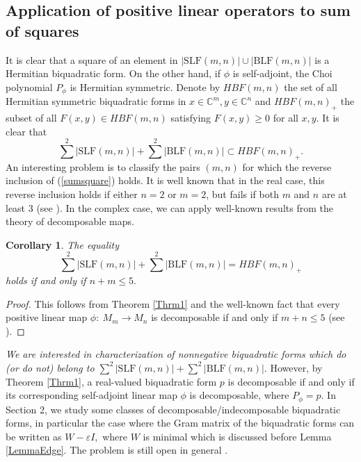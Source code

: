 \documentclass[12pt,a4paper]{amsart}
\theoremstyle{plain}
\newtheorem{corollary}[theorem]{Corollary}
\theoremstyle{remark}
\theoremstyle{definition}
\def \C {\mathbb{C}}
\begin{document}
\subsection{Application of positive linear operators to sum of squares}
 
It is clear that a square of an element in $|\textrm{SLF}(m,n)| \cup |\textrm{BLF}(m,n)|$ is a Hermitian biquadratic form. On the other hand, if $\phi$ is self-adjoint, the Choi polynomial $P_{\phi}$ is Hermitian symmetric. Denote by $HBF(m,n)$ the set of all Hermitian symmetric biquadratic forms in $x\in \C^m, y\in \C^n$ and $HBF(m,n)_+$ the subset of all $F(x,y) \in HBF(m,n)$ satisfying $F(x,y) \ge 0$ for all $x,y.$ It is clear that 
\begin{equation}\label{sumsquare}
	{\sum}^2 |\textrm{SLF}(m,n)| + {\sum}^2|\textrm{BLF}(m,n)| \subset HBF(m,n)_+. 
\end{equation}
An interesting problem is to classify the pairs $(m, n)$ for which the reverse inclusion of (\ref{sumsquare}) holds. It is well known that in the real case, this reverse inclusion holds if either $n=2$ or $m=2$, but fails if both $m$ and $n$ are at least 3 (see \cite{Choi75a}). In the complex case, we can apply well-known results from the theory of decomposable maps.
\begin{corollary} The equality
	\begin{equation*}%
		{\sum}^2 |\textrm{SLF}(m,n)| + {\sum}^2|\textrm{BLF}(m,n)| = HBF(m,n)_+
	\end{equation*}
	holds if and only if $n+m\le 5.$
\end{corollary}
\begin{proof}
	This follows from Theorem \ref{Thrm1} and the well-known fact that every positive linear map $\phi: \ M_m \to M_n$ is decomposable if and only if $m+n \le 5$ (see \cite{Woronowicz76}).
\end{proof}
\textit{We are interested in characterization of nonnegative biquadratic forms which do (or do not) belong to $\sum^2 |\textrm{SLF}(m,n)| + \sum^2|\textrm{BLF}(m,n)| .$} However, by Theorem \ref{Thrm1}, a real-valued biquadratic form $p$ is decomposable if and only if its corresponding self-adjoint linear map $\phi$ is decomposable, where $P_{\phi} =p.$ 
In Section 2, we study some classes of decomposable/indecomposable biquadratic forms, in particular the case where the Gram matrix of the biquadratic forms can be written as $W-\varepsilon I,$ where $W$ is minimal which is discussed before Lemma \ref{LemmaEdge}. The problem is still open in general .
\end{document}
